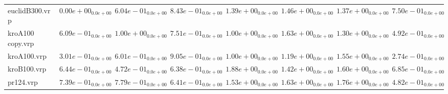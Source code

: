\documentclass{article}
\begin{document}
\begin{table}
\begin{scriptsize}
\begin{tabular}{llllllll}
euclidB300.vrp & \cellcolor{gray95}$  0.00e+00_{ 0.0e+00}$ & \cellcolor{gray25}$  6.04e-01_{ 0.0e+00}$ & $  8.43e-01_{ 0.0e+00}$ & $  1.39e+00_{ 0.0e+00}$ & $  1.46e+00_{ 0.0e+00}$ & $  1.37e+00_{ 0.0e+00}$ & $  7.50e-01_{ 0.0e+00}$ \\
kroA100 copy.vrp & \cellcolor{gray25}$  6.09e-01_{ 0.0e+00}$ & $  1.00e+00_{ 0.0e+00}$ & $  7.51e-01_{ 0.0e+00}$ & $  1.00e+00_{ 0.0e+00}$ & $  1.63e+00_{ 0.0e+00}$ & $  1.30e+00_{ 0.0e+00}$ & \cellcolor{gray95}$  4.92e-01_{ 0.0e+00}$ \\
kroA100.vrp & \cellcolor{gray25}$  3.01e-01_{ 0.0e+00}$ & $  6.01e-01_{ 0.0e+00}$ & $  9.05e-01_{ 0.0e+00}$ & $  1.00e+00_{ 0.0e+00}$ & $  1.19e+00_{ 0.0e+00}$ & $  1.55e+00_{ 0.0e+00}$ & \cellcolor{gray95}$  2.74e-01_{ 0.0e+00}$ \\
kroB100.vrp & $  6.44e-01_{ 0.0e+00}$ & \cellcolor{gray95}$  4.72e-01_{ 0.0e+00}$ & \cellcolor{gray25}$  6.38e-01_{ 0.0e+00}$ & $  1.88e+00_{ 0.0e+00}$ & $  1.42e+00_{ 0.0e+00}$ & $  1.60e+00_{ 0.0e+00}$ & $  6.85e-01_{ 0.0e+00}$ \\
pr124.vrp & $  7.39e-01_{ 0.0e+00}$ & $  7.79e-01_{ 0.0e+00}$ & \cellcolor{gray25}$  6.41e-01_{ 0.0e+00}$ & $  1.53e+00_{ 0.0e+00}$ & $  1.63e+00_{ 0.0e+00}$ & $  1.76e+00_{ 0.0e+00}$ & \cellcolor{gray95}$  4.82e-01_{ 0.0e+00}$ \\
\hline
\end{tabular}
\end{scriptsize}
\end{table}
\end{document}
